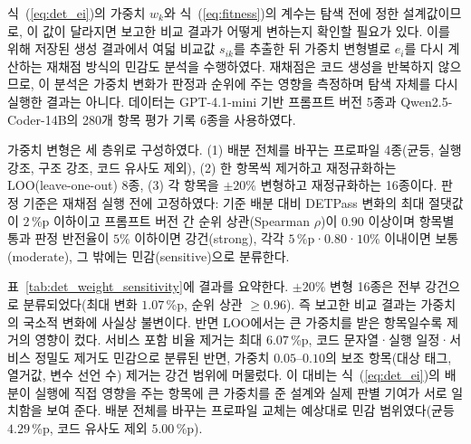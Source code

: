 \documentclass[10pt,twocolumn]{article}
\newenvironment{revision}{\begingroup\color{revisionblue}}{\endgroup}
\begin{document}
\begin{revision}
식~(\ref{eq:det_ei})의 가중치 $w_k$와 식~(\ref{eq:fitness})의 계수는 탐색 전에 정한 설계값이므로, 이 값이 달라지면 보고한 비교 결과가 어떻게 변하는지 확인할 필요가 있다. 이를 위해 저장된 생성 결과에서 여덟 비교값 $s_{ik}$를 추출한 뒤 가중치 변형별로 $e_i$를 다시 계산하는 재채점 방식의 민감도 분석을 수행하였다. 재채점은 코드 생성을 반복하지 않으므로, 이 분석은 가중치 변화가 판정과 순위에 주는 영향을 측정하며 탐색 자체를 다시 실행한 결과는 아니다. 데이터는 GPT-4.1-mini 기반 프롬프트 버전 5종과 Qwen2.5-Coder-14B의 280개 항목 평가 기록 6종을 사용하였다.

가중치 변형은 세 층위로 구성하였다. (1) 배분 전체를 바꾸는 프로파일 4종(균등, 실행 강조, 구조 강조, 코드 유사도 제외), (2) 한 항목씩 제거하고 재정규화하는 LOO(leave-one-out) 8종, (3) 각 항목을 $\pm20\%$ 변형하고 재정규화하는 16종이다. 판정 기준은 재채점 실행 전에 고정하였다: 기준 배분 대비 DETPass 변화의 최대 절댓값이 $2$\,\%p 이하이고 프롬프트 버전 간 순위 상관(Spearman $\rho$)이 $0.90$ 이상이며 항목별 통과 판정 반전율이 $5\%$ 이하이면 강건(strong), 각각 $5$\,\%p·$0.80$·$10\%$ 이내이면 보통(moderate), 그 밖에는 민감(sensitive)으로 분류한다.

\begin{table}[!t]
\color{revisionblue}
\centering
\caption{\textcolor{revisionblue}{DET 가중치 변형에 대한 재채점 민감도 요약. 기준 배분 대비 DETPass 변화(최대·평균), 프롬프트 버전 순위 상관, 항목별 판정 반전율과 사전 고정 기준에 따른 판정이다.}}
\label{tab:det_weight_sensitivity}
\small
\resizebox{0.86\textwidth}{!}{}
\end{table}

표~\ref{tab:det_weight_sensitivity}에 결과를 요약한다. $\pm20\%$ 변형 16종은 전부 강건으로 분류되었다(최대 변화 $1.07$\,\%p, 순위 상관 $\geq 0.96$). 즉 보고한 비교 결과는 가중치의 국소적 변화에 사실상 불변이다. 반면 LOO에서는 큰 가중치를 받은 항목일수록 제거의 영향이 컸다. 서비스 포함 비율 제거는 최대 $6.07$\,\%p, 코드 문자열·실행 일정·서비스 정밀도 제거도 민감으로 분류된 반면, 가중치 $0.05$--$0.10$의 보조 항목(대상 태그, 열거값, 변수 선언 수) 제거는 강건 범위에 머물렀다. 이 대비는 식~(\ref{eq:det_ei})의 배분이 실행에 직접 영향을 주는 항목에 큰 가중치를 준 설계와 실제 판별 기여가 서로 일치함을 보여 준다. 배분 전체를 바꾸는 프로파일 교체는 예상대로 민감 범위였다(균등 $4.29$\,\%p, 코드 유사도 제외 $5.00$\,\%p).

\begin{table}[t]
\color{revisionblue}
\centering
\caption{\textcolor{revisionblue}{통과 임계값 $\tau$에 따른 DETPass(\%) 변화. 열은 프롬프트 버전 5종(GPT-4.1-mini)과 Qwen2.5-Coder-14B이다.}}
\label{tab:tau_sensitivity}
\footnotesize
\resizebox{\columnwidth}{!}{}
\end{table}


\end{revision}
\end{document}

